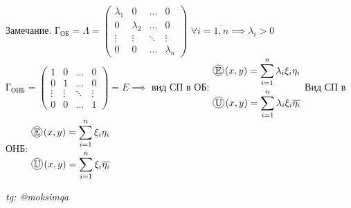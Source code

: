 \documentclass[../main.tex]{subfiles}
\begin{document}
Замечание. $\text{Г}_{\text{ОБ}}= \Lambda = \begin{pmatrix}
    \lambda_{1}& 0 &\dots&0 \\ 
    0& \lambda_{2} & \dots & 0 \\ 
    \vdots & \vdots & \ddots & \vdots \\ 
    0 & 0 & \dots & \lambda_{n}
\end{pmatrix}$ \qquad $\forall i=\overline{1,n}\implies \lambda_{i}>0$ \\ 
$\text{Г}_{\text{ОНБ}} = \begin{pmatrix}
    1& 0 &\dots&0 \\ 
    0& 1 & \dots & 0 \\ 
    \vdots & \vdots & \ddots & \vdots \\ 
    0 & 0 & \dots & 1
\end{pmatrix}=E\implies $ вид СП в ОБ: 
$\begin{aligned}
 &\tcircle{$\E$} \;(x,y) = \sum_{i =1}^{n  } \lambda_{i} \xi_{i}\eta_{i} \\
 &\tcircle{$\U$} \;(x,y) = \sum_{i =1}^{n} \lambda_{i}\xi_{i}\overline{\eta_{i}}  
\end{aligned}$
\noindent Вид СП в ОНБ:
$\begin{aligned}
 &\tcircle{$\E$}\; (x,y) = \sum_{i =1}^{n  } \xi_{i}\eta_{i} \\
 &\tcircle{$\U$} \;(x,y) = \sum_{i =1}^{n} \xi_{i}\overline{\eta_{i}}  
\end{aligned}$



\vspace{1cm}
\begin{flushright}
    \textit{tg: @moksimqa}
\end{flushright}
\end{document}
